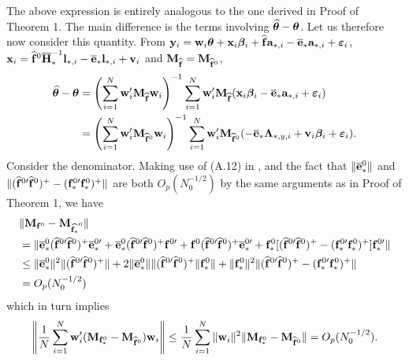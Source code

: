 \documentclass[12pt,fleqn]{article}
\begin{document}
The above expression is entirely analogous to the one derived in Proof of Theorem 1. The main difference is the terms involving $\widehat{\boldsymbol{\theta}} - \boldsymbol{\theta}$. Let us therefore now consider this quantity. From $\mathbf{y}_{i}= \mathbf{w}_{i}\boldsymbol{\theta} + \mathbf{x}_{i}\boldsymbol{\beta}_i + \widehat{\mathbf{f}}\mathbf{a}_{*,i} - \overline{\mathbf{e}}_*\mathbf{a}_{*,i} +  \boldsymbol{\varepsilon}_{i}$, $\mathbf{x}_i = \widehat{\mathbf{f}}^0\overline{\mathbf{H}}_*^{-1}\mathbf{l}_{*,i}  - \overline{\mathbf{e}}_{*}\mathbf{l}_{*,i}  + \mathbf{v}_i$ and $\mathbf{M}_{\widehat{\mathbf{f}}} = \mathbf{M}_{\widehat{\mathbf{f}}^0}$,
\begin{align}
\widehat{\boldsymbol{\theta}} - \boldsymbol{\theta} &= \left(\sum_{i=1}^N  \mathbf{w}_{i}'\mathbf{M}_{\widehat{\mathbf{f}}}\mathbf{w}_{i}\right)^{-1}\sum_{i=1}^N \mathbf{w}_{i}' \mathbf{M}_{\widehat{\mathbf{f}}}(\mathbf{x}_{i}\boldsymbol{\beta}_i - \overline{\mathbf{e}}_*\mathbf{a}_{*,i} +  \boldsymbol{\varepsilon}_{i})\notag\\
&= \left(\sum_{i=1}^N  \mathbf{w}_{i}'\mathbf{M}_{\widehat{\mathbf{f}}^0}\mathbf{w}_{i}\right)^{-1}\sum_{i=1}^N \mathbf{w}_{i}' \mathbf{M}_{\widehat{\mathbf{f}}^0}(-\overline{\mathbf{e}}_{*}\boldsymbol{\Lambda}_{*,y,i}  + \mathbf{v}_i\boldsymbol{\beta}_i +  \boldsymbol{\varepsilon}_{i}).
\end{align}
Consider the denominator. Making use of (A.12) in \citet{westerlund2019cce}, and the fact that $\|\overline{\mathbf{e}}_*^0\|$ and $\|(\widehat{\mathbf{f}}^{0\prime}\widehat{\mathbf{f}}^0)^{+} - (\mathbf{f}_*^{0\prime}\mathbf{f}_*^{0})^{+}\|$ are both $O_p(N_0^{-1/2})$ by the same arguments as in Proof of Theorem 1, we have
\begin{align}\label{mdiff}
& \|\mathbf{M}_{\mathbf{f}^0} - \mathbf{M}_{\widehat{\mathbf{f}_*}^0}\| \notag\\
&= \|\overline{\mathbf{e}}_*^0(\widehat{\mathbf{f}}^{0\prime}\widehat{\mathbf{f}}^0)^{+}\overline{\mathbf{e}}_*^{0\prime} + \overline{\mathbf{e}}_*^0(\widehat{\mathbf{f}}^{0\prime}\widehat{\mathbf{f}}^0)^{+} \mathbf{f}^{0\prime} +  \mathbf{f}^{0}(\widehat{\mathbf{f}}^{0\prime}\widehat{\mathbf{f}}^0)^{+} \overline{\mathbf{e}}_*^{0\prime} +  \mathbf{f}_*^{0}[(\widehat{\mathbf{f}}^{0\prime}\widehat{\mathbf{f}}^0)^{+} - (\mathbf{f}_*^{0\prime}\mathbf{f}_*^{0})^{+}] \mathbf{f}_*^{0\prime}\| \notag\\
&\leq \|\overline{\mathbf{e}}_*^0\|^2 \|(\widehat{\mathbf{f}}^{0\prime}\widehat{\mathbf{f}}^0)^{+}\| + 2 \|\overline{\mathbf{e}}_*^0\|\|(\widehat{\mathbf{f}}^{0\prime}\widehat{\mathbf{f}}^0)^{+}\| \mathbf{f}_*^{0}\| + \|\mathbf{f}_*^{0}\|^2 \|(\widehat{\mathbf{f}}^{0\prime}\widehat{\mathbf{f}}^0)^{+} - (\mathbf{f}_*^{0\prime}\mathbf{f}_*^{0})^{+}\| \notag\\
& = O_p(N_0^{-1/2})
\end{align}
which in turn implies
\begin{align}
\left\| \frac{1}{N}\sum_{i=1}^N  \mathbf{w}_{i}'(\mathbf{M}_{\mathbf{f}_*^0} - \mathbf{M}_{\widehat{\mathbf{f}}^0})\mathbf{w}_{i} \right\| \leq \frac{1}{N}\sum_{i=1}^N  \|\mathbf{w}_{i}\|^2 \|\mathbf{M}_{\mathbf{f}_*^0} - \mathbf{M}_{\widehat{\mathbf{f}}^0}\| = O_p(N_0^{-1/2}).
\end{align}
\end{document}
